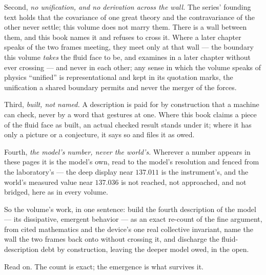 Second, \emph{no unification, and no derivation across the wall.} The series'
founding text holds that the covariance of one great theory and the
contravariance of the other never settle; this volume does not marry them. There
is a wall between them, and this book names it and refuses to cross it. Where a
later chapter speaks of the two frames meeting, they meet only at that wall ---
the boundary this volume \emph{takes} the fluid face to be, and examines in a
later chapter without ever crossing --- and never in each other; any sense in
which the volume speaks of physics ``unified'' is representational and kept in
its quotation marks, the unification a shared boundary permits and never the
merger of the forces.

Third, \emph{built, not named.} A description is paid for by construction that a
machine can check, never by a word that gestures at one. Where this book claims
a piece of the fluid face as built, an actual checked result stands under it;
where it has only a picture or a conjecture, it says so and files it as owed.

Fourth, \emph{the model's number, never the world's.} Wherever a number appears
in these pages it is the model's own, read to the model's resolution and fenced
from the laboratory's --- the deep display near $137.011$ is the instrument's,
and the world's measured value near $137.036$ is not reached, not approached,
and not bridged, here as in every volume.

So the volume's work, in one sentence: build the fourth description of the model
--- its dissipative, emergent behavior --- as an exact re-count of the fine
argument, from cited mathematics and the device's one real collective invariant,
name the wall the two frames back onto without crossing it, and discharge the
fluid-description debt by construction, leaving the deeper model owed, in the
open.

Read on. The count is exact; the emergence is what survives it.

